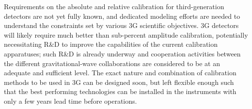 Requirements on the absolute and relative calibration for third-generation detectors are not yet fully known, and dedicated modeling efforts are needed to understand the constraints set by various 3G scientific objectives. 3G detectors will likely require much better than sub-percent amplitude calibration, potentially necessitating R\&D to improve the capabilities of the current calibration apparatuses; such R\&D is already underway and cooperation activities between the different gravitational-wave collaborations are considered to be at an adequate and sufficient level. The exact nature and combination of calibration methods to be used in 3G can be designed soon, but left flexible enough such that the best performing technologies can be installed in the instruments with only a few years lead time before operations. 